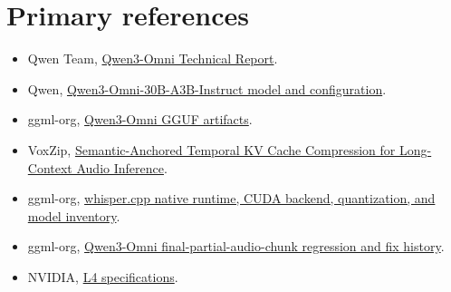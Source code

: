 \documentclass[10pt,letterpaper]{article}
\begin{document}
\section*{Primary references}
\small
\begin{itemize}
    \item Qwen Team, \href{https://arxiv.org/abs/2509.17765}{Qwen3-Omni Technical Report}.
    \item Qwen, \href{https://huggingface.co/Qwen/Qwen3-Omni-30B-A3B-Instruct}{Qwen3-Omni-30B-A3B-Instruct model and configuration}.
    \item ggml-org, \href{https://huggingface.co/ggml-org/Qwen3-Omni-30B-A3B-Instruct-GGUF}{Qwen3-Omni GGUF artifacts}.
    \item VoxZip, \href{https://arxiv.org/abs/2608.08569}{Semantic-Anchored Temporal KV Cache Compression for Long-Context Audio Inference}.
    \item ggml-org, \href{https://github.com/ggml-org/whisper.cpp}{whisper.cpp native runtime, CUDA backend, quantization, and model inventory}.
    \item ggml-org, \href{https://github.com/ggml-org/llama.cpp/issues/22591}{Qwen3-Omni final-partial-audio-chunk regression and fix history}.
    \item NVIDIA, \href{https://www.nvidia.com/en-us/data-center/l4/}{L4 specifications}.
\end{itemize}
\end{document}
